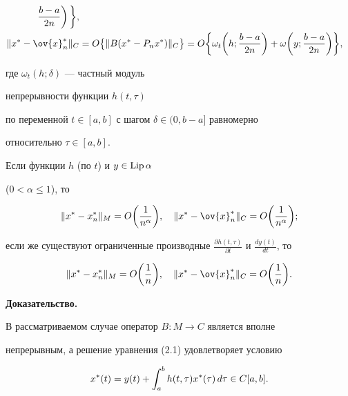 \begin{thms}
\begin{align}
\frac{b-a}{2n}\bigg)\, \bigg\}, \\


%


\|x^*-\ov{x}_n^*\|_C&=O\bigl\{\|B(x^* -P_nx^*)\|_C\bigr\}=


O\bigg\{\omega_t\bigg(h;\frac{b-a}{2n}\bigg)+\omega\bigg(y;


\frac{b-a}{2n}\bigg)\bigg\},


\end{align}


где $\omega_t(h;\delta)$ --- частный модуль 


непрерывности функции $h(t,\tau)$


по переменной $t\in [a,b]$ с шагом $\delta\in (0,b-a]$ равномерно


относительно $\tau\in [a,b]$.


\end{thms}





\begin{cornonum}


Если функции $h$ (по $t$) и $y\in\operatorname{Lip} \alpha$


($0<\alpha\leq 1$), то


$$


\|x^*-x_n^*\|_M=O\bigg(\frac{1}{n^\alpha}\bigg),\quad


\|x^*-\ov{x}_n^*\|_C=O\bigg(\frac{1}{n^\alpha}\bigg);


$$


если же существуют ограниченные производные $\frac{\partial h(t,\tau)}{


\partial t}$ и $\frac{dy(t)}{dt}$, то


$$


\|x^*-x_n^*\|_M=O\bigg(\frac{1}{n}\bigg) ,\quad


\|x^*-\ov{x}_n^*\|_C=O\bigg(\frac{1}{n}\bigg).


$$


\end{cornonum}





{\bf Доказательство.}


В рассматриваемом случае оператор $B: M\rightarrow C$ является вполне


непрерывным, а решение уравнения (2.1) удовлетворяет условию


\begin{equation}


x^*(t)=y(t)+\intl_a^bh(t,\tau)x^*(\tau)\, d\tau\in C[a,b].


\end{equation}


